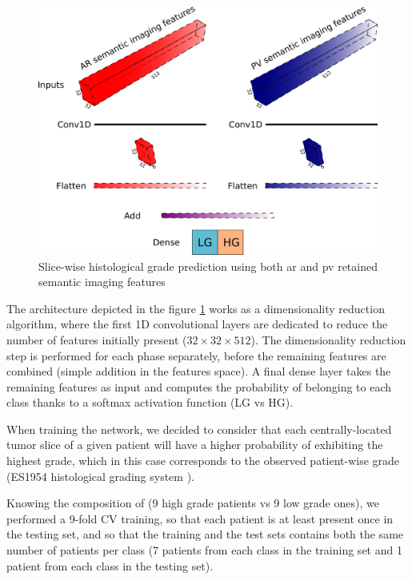 \begin{figure}[th!]
\centering
\includegraphics[width=0.9\linewidth]{../HistologicalGradePrediction/images/gradpredictionArchitecture}
\caption{Slice-wise histological grade prediction using both \ac{ar} and \ac{pv} retained semantic imaging features}
\label{fig:gradpredictionArchitecture}
\end{figure}



The architecture depicted in the figure \ref{fig:gradpredictionArchitecture} works as a dimensionality
reduction algorithm, where the first 1D convolutional layers are dedicated to
reduce the number of features initially present ($ 32\times32\times512 $). The
dimensionality reduction step is performed for each phase separately,
before the remaining features are combined (simple addition in the
features space).
A final dense layer takes the remaining features as input and computes
the probability of belonging to each class thanks to a softmax activation
function (LG vs HG).

When training the network, we decided to consider that each
centrally-located tumor slice of a given patient will have a higher
probability of exhibiting the highest grade, which in this case
corresponds to the observed patient-wise grade (ES1954 histological grading system \cite{EdmondsonHA1954}).

Knowing the composition of \textbf{} (9 high grade patients vs 9 low
grade ones), we performed a 9-fold CV training, so that each patient is
at least present once in the testing set, and so that the training and
the test sets contains both the same number of patients per
class (7 patients from each class in the training set and 1 patient from
each class in the testing set).

